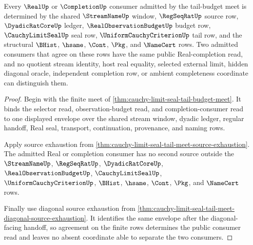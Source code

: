 \begin{theorem}
\label{thm:cauchy-limit-seal-tail-budget-meet-consumer-determinacy}
Every $\RealUp$ or $\CompletionUp$ consumer admitted by the tail-budget meet is determined by the shared $\StreamNameUp$ window, $\RegSeqRatUp$ source row, $\DyadicRatCoreUp$ ledger, $\RealObservationBudgetUp$ budget row, $\CauchyLimitSealUp$ seal row, $\UniformCauchyCriterionUp$ tail row, and the structural $\BHist$, $\hsame$, $\Cont$, $\Pkg$, and $\NameCert$ rows. Two admitted consumers that agree on these rows have the same public Real-completion read, and no quotient stream identity, host real equality, selected external limit, hidden diagonal oracle, independent completion row, or ambient completeness coordinate can distinguish them.
\end{theorem}
\begin{proof}
Begin with the finite meet of \autoref{thm:cauchy-limit-seal-tail-budget-meet}. It binds the selector read, observation-budget read, and completion-consumer read to one displayed envelope over the shared stream window, dyadic ledger, regular handoff, Real seal, transport, continuation, provenance, and naming rows.

Apply source exhaustion from \autoref{thm:cauchy-limit-seal-tail-meet-source-exhaustion}. The admitted Real or completion consumer has no second source outside the $\StreamNameUp$, $\RegSeqRatUp$, $\DyadicRatCoreUp$, $\RealObservationBudgetUp$, $\CauchyLimitSealUp$, $\UniformCauchyCriterionUp$, $\BHist$, $\hsame$, $\Cont$, $\Pkg$, and $\NameCert$ rows.

Finally use diagonal source exhaustion from \autoref{thm:cauchy-limit-seal-tail-meet-diagonal-source-exhaustion}. It identifies the same envelope after the diagonal-facing handoff, so agreement on the finite rows determines the public consumer read and leaves no absent coordinate able to separate the two consumers.
\end{proof}

